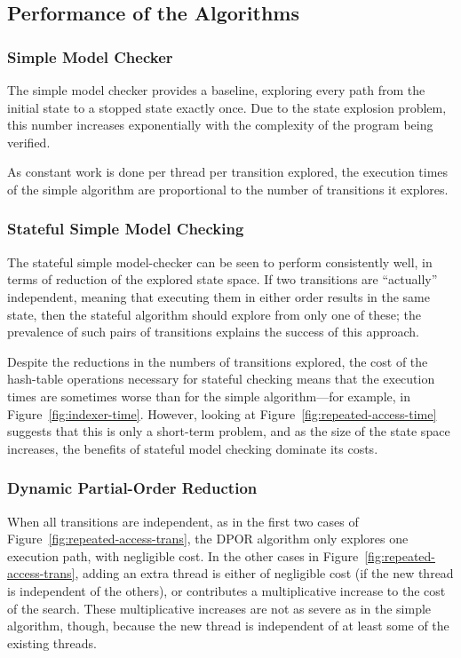 \documentclass[12pt,a4paper,twoside,openright]{report}
\begin{document}
\subsection{Performance of the Algorithms}

\subsubsection{Simple Model Checker}
The simple model checker provides a
baseline, exploring every path from
the initial state to a stopped state
exactly once. Due to the state explosion
problem, this number increases
exponentially with the complexity
of the program being verified.

As constant work is done per thread per transition
explored, the execution times of the simple
algorithm are
proportional to the number of transitions it
explores.

\subsubsection{Stateful Simple Model Checking}
The stateful simple model-checker can be
seen to perform consistently well, in terms
of reduction of the explored state space.
If two transitions are ``actually'' independent,
meaning that executing them in either order
results in the same state, then the stateful
algorithm should explore from only one of these;
the prevalence of such pairs of transitions
explains the success of this approach.

Despite the reductions in the numbers
of transitions explored, the cost of
the hash-table operations
necessary for stateful checking means that
the execution times
are sometimes worse than for the
simple algorithm---for example,
in Figure~\ref{fig:indexer-time}.
However, looking at Figure~\ref{fig:repeated-access-time}
suggests that this is only a short-term
problem, and as the size of the state
space increases, the benefits of
stateful model checking
dominate its costs.

\subsubsection{Dynamic Partial-Order Reduction}
When all transitions are independent,
as in the first two cases of
Figure~\ref{fig:repeated-access-trans},
the DPOR algorithm only explores
one execution path, with negligible cost.
In the other cases in
Figure~\ref{fig:repeated-access-trans},
adding an extra thread is either of
negligible cost (if the new thread
is independent of the others), or
contributes a multiplicative
increase to the cost of the search.
These multiplicative increases are
not as severe as in the
simple algorithm, though, because the new
thread is independent of at least some of
the existing threads.
\end{document}
